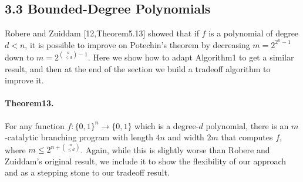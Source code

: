 \subsection*{3.3 Bounded-Degree Polynomials}
Robere and Zuiddam [12,Theorem5.13] showed that if $f$ is a polynomial of degree $d<n$, it is possible to improve on Potechin's theorem by decreasing $m=2^{2^n-1}$ down to $m=2^{\binom n{\leq d}-1}$. Here we show how to adapt Algorithm1 to get a similar result, and then at the end of the section we build a tradeoff algorithm to improve it.
\paragraph{Theorem13.} For any function $f:\{0,1\}^n\to\{0,1\}$ which is a degree-$d$ polynomial, there is an $m$-catalytic branching program with length $4n$ and width $2m$ that computes $f$, where $m\leq2^{n+\binom n{\leq d}}$.
Again, while this is slightly worse than Robere and Zuiddam's original result, we include it to show the flexibility of our approach and as a stepping stone to our tradeoff result.
